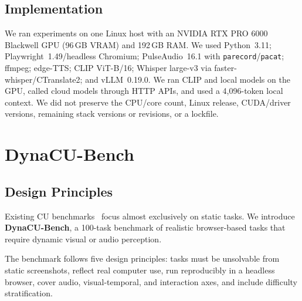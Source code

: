 \documentclass[letterpaper]{article} %
\begin{document}
\subsection{Implementation}
\label{sec:implementation}

We ran experiments on one Linux host with an NVIDIA RTX PRO 6000 Blackwell GPU (96\,GB VRAM) and 192\,GB RAM. We used Python~3.11; Playwright~1.49/headless Chromium; PulseAudio~16.1 with \texttt{parecord}/\texttt{pacat}; ffmpeg; edge-TTS; CLIP ViT-B/16; Whisper large-v3 via faster-whisper/CTranslate2; and vLLM~0.19.0. We ran CLIP and local models on the GPU, called cloud models through HTTP APIs, and used a 4,096-token local context. We did not preserve the CPU/core count, Linux release, CUDA/driver versions, remaining stack versions or revisions, or a lockfile.

\section{DynaCU-Bench}
\label{sec:benchmark}

\subsection{Design Principles}
\label{sec:design-principles}

Existing CU benchmarks~\citep{osworld,webarena,webvoyager} focus almost exclusively on static tasks. We introduce \textbf{DynaCU-Bench}, a 100-task benchmark of realistic browser-based tasks that require dynamic visual or audio perception.

The benchmark follows five design principles: tasks must be unsolvable from static screenshots, reflect real computer use, run reproducibly in a headless browser, cover audio, visual-temporal, and interaction axes, and include difficulty stratification.
\end{document}
